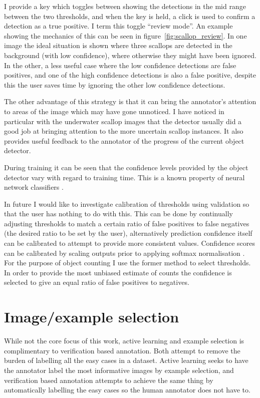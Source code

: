 I provide a key which toggles between showing the detections in the mid range between the two thresholds, and when the key is held, a click is used to confirm a detection as a true positive. I term this toggle ``review mode''.  An example showing the mechanics of this can be seen in figure~\ref{fig:scallop_review}. In one image the ideal situation is shown where three scallops are detected in the background (with low confidence), where otherwise they might have been ignored. In the other, a less useful case where the low confidence detections are false positives, and one of the high confidence detections is also a false positive, despite this the user saves time by ignoring the other low confidence detections.

The other advantage of this strategy is that it can bring the annotator's attention to areas of the image which may have gone unnoticed. I have noticed in particular with the underwater scallop images that the detector usually did a good job at bringing attention to the more uncertain scallop instances. It also provides useful feedback to the annotator of the progress of the current object detector. 

During training it can be seen that the confidence levels provided by the object detector vary with regard to training time. This is a known property of neural network classifiers \cite{Guo2017}.

In future I would like to investigate calibration of thresholds using validation so that the user has nothing to do with this. This can be done by continually adjusting thresholds to match a certain ratio of false positives to false negatives (the desired ratio to be set by the user), alternatively prediction confidence itself can be calibrated to attempt to provide more consistent values. Confidence scores can be calibrated by scaling outputs prior to applying softmax normalisation \cite{Guo2017}. For the purpose of object counting I use the former method to select thresholds. In order to provide the most unbiased estimate of counts the confidence is selected to give an equal ratio of false positives to negatives.
 


\section{Image/example selection}
\label{sec:example_selection}

While not the core focus of this work, active learning and example selection is complimentary to verification based annotation. Both attempt to remove the burden of labelling all the easy cases in a dataset. Active learning seeks to have the annotator label the most informative images by example selection, and verification based annotation attempts to achieve the same thing by automatically labelling the easy cases so the human annotator does not have to. 

